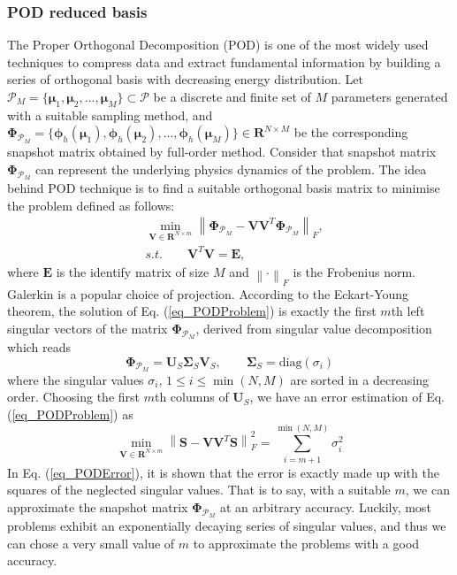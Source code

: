 \documentclass[preprint, 10pt]{elsarticle}
\begin{document}
\subsubsection{POD reduced basis}
The Proper Orthogonal Decomposition (POD) is one of the most widely used techniques to compress data and extract fundamental information by building a series of orthogonal basis
with decreasing energy distribution.
Let $\mathcal{P}_M=\{\pmb{\mu}_1, \pmb{\mu}_2,...,\pmb{\mu}_M\} \subset \mathcal{P}$ be a discrete and finite set of $M$ parameters generated with a suitable sampling method, and $\pmb {\Phi}_{\mathcal{P}_M}=\{\pmb{\phi}_h(\pmb{\mu}_1), \pmb{\phi}_h(\pmb{\mu}_2),...,\pmb{\phi}_h(\pmb{\mu}_M)\}  \in \mathbf{R}^{N \times M}$ be the corresponding snapshot matrix obtained by full-order method. Consider that snapshot matrix $\pmb {\Phi}_{\mathcal{P}_M}$ can represent the underlying physics dynamics of the problem. The idea behind POD technique is to find a suitable orthogonal basis matrix to minimise the problem defined as follows:
\begin{equation}
\begin{aligned}
&\mathop {\min}\limits_{\mathbf{V} \in \mathbf{R}^{N\times m}}
\left\| {\pmb {\Phi}_{\mathcal{P}_M} - \mathbf{V}\mathbf{V}^T \pmb {\Phi}_{\mathcal{P}_M}} \right\|_F, \\
&s.t. \qquad \mathbf{V}^T\mathbf{V} = \mathbf{E},
\end{aligned}
\label{eq_PODProblem}
\end{equation}
where $\mathbf{E}$ is the identify matrix of size $M$ and $\left\| \cdot \right\|_F$ is the Frobenius norm.
Galerkin is a popular choice of projection.
According to the Eckart-Young theorem, the solution of Eq. (\ref{eq_PODProblem}) is exactly  the first $m$th left singular vectors of the matrix $\pmb {\Phi}_{\mathcal{P}_M}$, derived from singular value decomposition which reads
\begin{equation}
\pmb {\Phi}_{\mathcal{P}_M} = \mathbf{U}_S \pmb{\Sigma} _S \mathbf{V}_S, \qquad \pmb{\Sigma} _S = \text{diag} \left(  \sigma _i  \right)
\end{equation}
where  the singular values $\sigma _i$, $1 \le i \le \min(N,M)$ are sorted in a decreasing order. Choosing the first $m$th columns of
 $\mathbf{U}_S$, we have an error estimation of Eq. (\ref{eq_PODProblem}) as
 \begin{equation}
 \mathop {\min}\limits_{\mathbf{V} \in \mathbf{R}^{N\times m}}
\left\| {\mathbf{S} - \mathbf{V}\mathbf{V}^T\mathbf{S}} \right\|_{F}^{2}
=\sum_{i=m+1}^{\min(N,M)} \sigma _{i}^{2}
\label{eq_PODError}
 \end{equation}
In Eq. (\ref{eq_PODError}), it is shown that the error is exactly made up with  the squares of the neglected singular values. That is to say, with a suitable $m$, we can approximate the snapshot matrix $\pmb {\Phi}_{\mathcal{P}_M}$ at an arbitrary accuracy.  Luckily, most problems exhibit an exponentially decaying series of singular values, and thus we can chose a very small value of $m$ to approximate the problems with a good accuracy.
\end{document}
